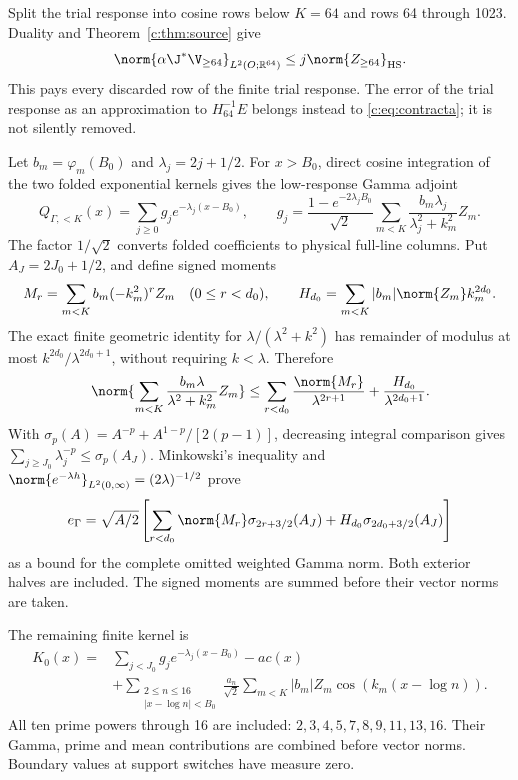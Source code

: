 \documentclass[11pt,a4paper]{article}
\numberwithin{equation}{section}
\theoremstyle{definition}\newtheorem{definition}[theorem]{Definition}
\theoremstyle{remark}\newtheorem{remark}[theorem]{Remark}
\newcommand{\R}{\mathbb R}\newcommand{\C}{\mathbb C}\newcommand{\N}{\mathbb N}
\begin{document}
Split the trial response into cosine rows below $K=64$ and rows
64 through 1023. Duality and Theorem~\ref{c:thm:source} give
\begin{equation}\label{c:eq:highrow}
 \norm{\alpha\J^*\V_{\ge64}}_{L^2(O;\R^{64})}
 \le j\norm{Z_{\ge64}}_{\rm HS}.
\end{equation}
This pays every discarded row of the finite trial response. The error
of the trial response as an approximation to $H_{64}^{-1}E$ belongs instead
to \eqref{c:eq:contracta}; it is not silently removed.

Let $b_m=\varphi_m({B_0})$ and $\lambda_j=2j+1/2$.
For $x>{B_0}$, direct cosine integration of the two folded exponential
kernels gives the low-response Gamma adjoint
\begin{equation}\label{c:eq:Qgamma}
 Q_{\Gamma,<K}(x)=\sum_{j\ge0}g_je^{-\lambda_j(x-{B_0})},\qquad
 g_j=\frac{1-e^{-2\lambda_jB_0}}{\sqrt2}
       \sum_{m<K}\frac{b_m\lambda_j}{\lambda_j^2+k_m^2}Z_m.
\end{equation}
The factor $1/\sqrt2$ converts folded coefficients to physical
full-line columns. Put $A_J=2J_0+1/2$, and define signed moments
\[
 M_r=\sum_{m<K}b_m(-k_m^2)^rZ_m\quad(0\le r<d_0),\qquad
 H_{d_0}=\sum_{m<K}|b_m|\norm{Z_m}k_m^{2d_0}.
\]
The exact finite geometric identity for
$\lambda/(\lambda^2+k^2)$ has remainder of modulus at most
$k^{2d_0}/\lambda^{2d_0+1}$, without requiring $k<\lambda$.
Therefore
\[
 \norm{\sum_{m<K}\frac{b_m\lambda}{\lambda^2+k_m^2}Z_m}
 \le\sum_{r<d_0}\frac{\norm{M_r}}{\lambda^{2r+1}}
       +\frac{H_{d_0}}{\lambda^{2d_0+1}}.
\]
With $\sigma_p(A)=A^{-p}+A^{1-p}/[2(p-1)]$, decreasing integral
comparison gives $\sum_{j\ge J_0}\lambda_j^{-p}\le\sigma_p(A_J)$.
Minkowski's inequality and
$\norm{e^{-\lambda h}}_{L^2(0,\infty)}=(2\lambda)^{-1/2}$ prove
\begin{equation}\label{c:eq:egamma}
 e_\Gamma=\sqrt{A/2}\left[
 \sum_{r<d_0}\norm{M_r}\sigma_{2r+3/2}(A_J)
 +H_{d_0}\sigma_{2d_0+3/2}(A_J)\right]
\end{equation}
as a bound for the complete omitted weighted Gamma norm. Both
exterior halves are included. The signed moments are summed before
their vector norms are taken.

The remaining finite kernel is
\begin{equation}\label{c:eq:K0}
 \begin{split}
 K_0(x)={}&\sum_{j<J_0}g_je^{-\lambda_j(x-{B_0})}-ac(x)\\
 &+\sum_{\substack{2\le n\le16\\|x-\log n|<{B_0}}}
  \frac{a_n}{\sqrt2}\sum_{m<K}|b_m|Z_m\cos(k_m(x-\log n)).
 \end{split}
\end{equation}
All ten prime powers through 16 are included:
$2,3,4,5,7,8,9,11,13,16$. Their Gamma, prime and mean contributions
are combined before vector norms. Boundary values at support switches
have measure zero.
\end{document}
